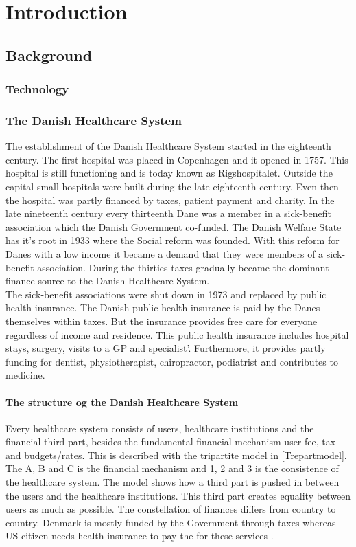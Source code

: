 \chapter{Introduction}

\section{Background}
\subsection{Technology}
\subsection{The Danish Healthcare System}



The establishment of the Danish Healthcare System started in the eighteenth century. The first hospital was placed in Copenhagen and it opened in 1757. This hospital is still functioning and is today known as Rigshospitalet. Outside the capital small hospitals were built during the late eighteenth century. Even then the hospital was partly financed by taxes, patient payment and charity. In the late nineteenth century every thirteenth Dane was a member in a sick-benefit association which the Danish Government co-funded. The Danish Welfare State has it's root in 1933 where the Social reform was founded. With this reform for Danes with a low income it became a demand that they were members of a sick-benefit association. During the thirties taxes gradually became the dominant finance source to the Danish Healthcare System.\\ 
The sick-benefit associations were shut down in 1973 and replaced by public health insurance. The Danish public health insurance is paid by the Danes themselves within taxes. But the insurance provides free care for everyone regardless of income and residence. This public health insurance includes hospital stays, surgery, visits to a GP and specialist'. Furthermore, it provides partly funding for dentist, physiotherapist, chiropractor, podiatrist and contributes to medicine.   \\

\subsubsection{The structure og the Danish Healthcare System}
Every healthcare system consists of users, healthcare institutions and the financial third part, besides the fundamental financial mechanism user fee, tax and budgets/rates. This is described with the tripartite model in \cref{Trepartmodel}. The A, B and C is the financial mechanism and 1, 2 and 3 is the consistence of the healthcare system. The model shows how a third part is pushed in between the users and the healthcare institutions. This third part creates equality between users as much as possible. The constellation of finances differs from country to country. Denmark is mostly funded by the Government through taxes whereas US citizen needs health insurance to pay the for these services \cite{sundhedsvaesen}. \\


